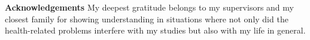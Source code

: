 \thispagestyle{plain}

\mbox{}
\vfill

\large
\textbf{Acknowledgements}
\normalsize
\noindent My deepest gratitude belongs to my supervisors and my closest family for showing understanding in situations where not only did the health-related problems interfere with my studies but also with my life in general.